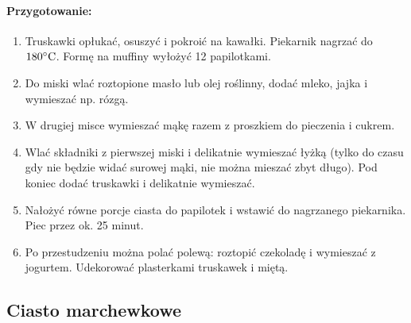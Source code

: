 \documentclass{article}
\begin{document}
    \paragraph{Przygotowanie:}
    \begin{enumerate}
        \item Truskawki opłukać, osuszyć i pokroić na kawałki. Piekarnik nagrzać
            do $180\celsius$. Formę na muffiny wyłożyć 12 papilotkami.
        \item Do miski wlać roztopione masło lub olej roślinny, dodać mleko,
            jajka i wymieszać np. rózgą.
        \item W drugiej misce wymieszać mąkę razem z proszkiem do pieczenia i
            cukrem.
        \item Wlać składniki z pierwszej miski i delikatnie wymieszać łyżką
            (tylko do czasu gdy nie będzie widać surowej mąki, nie można mieszać
            zbyt długo).  Pod koniec dodać truskawki i delikatnie wymieszać.
        \item Nałożyć równe porcje ciasta do papilotek i wstawić do nagrzanego
            piekarnika. Piec przez ok. 25 minut.
        \item Po przestudzeniu można polać polewą: roztopić czekoladę i
            wymieszać z jogurtem. Udekorować plasterkami truskawek i miętą.
    \end{enumerate}
    \newpage


    \subsection{Ciasto marchewkowe}
    \bigskip
\end{document}
